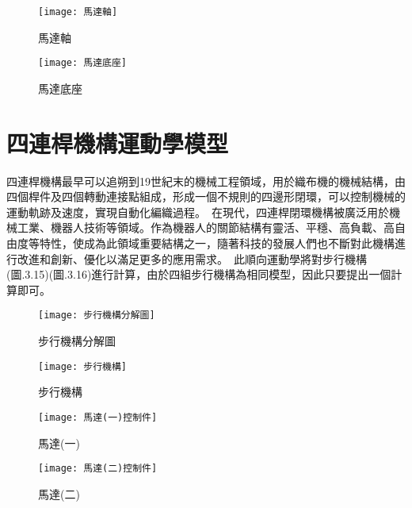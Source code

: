 \begin{figure}[htbp]
  \centering
  \begin{minipage}{0.3\textwidth}
    \centering
    \texttt{[image: 馬達軸]}
    \caption{馬達軸}
    \label{馬達軸}
  \end{minipage}
  \hfill
  \begin{minipage}{0.3\textwidth}
    \centering
    \texttt{[image: 馬達底座]}
    \caption{馬達底座}
    \label{馬達底座}
  \end{minipage}
 \end{figure}
\newpage

\section{四連桿機構運動學模型}

四連桿機構最早可以追朔到19世紀末的機械工程領域，用於織布機的機械結構，由四個桿件及四個轉動連接點組成，形成一個不規則的四邊形閉環，可以控制機械的運動軌跡及速度，實現自動化編織過程。\
在現代，四連桿閉環機構被廣泛用於機械工業、機器人技術等領域。作為機器人的關節結構有靈活、平穩、高負載、高自由度等特性，使成為此領域重要結構之一，隨著科技的發展人們也不斷對此機構進行改進和創新、優化以滿足更多的應用需求。\
此順向運動學將對步行機構(圖.3.15)(圖.3.16)進行計算，由於四組步行機構為相同模型，因此只要提出一個計算即可。\\
\begin{figure}[htbp]
  \begin{minipage}[t]{0.45\linewidth}
    \centering
    \texttt{[image: 步行機構分解圖]}
    \caption{步行機構分解圖}
    \label{步行機構分解圖}
  \end{minipage}
  \hfill
  \begin{minipage}[t]{0.45\linewidth}
    \centering
    \texttt{[image: 步行機構]}
    \caption{步行機構}
    \label{步行機構}
  \end{minipage}
\end{figure}
\newpage

\begin{figure}[htbp]
  \begin{minipage}[t]{0.5\linewidth}
    \centering
    \texttt{[image: 馬達(一)控制件]}
    \caption{馬達(一)}
    \label{馬達(一)控制件}
  \end{minipage}
  \hfill
  \begin{minipage}[t]{0.5\linewidth}
    \centering
    \texttt{[image: 馬達(二)控制件]}
    \caption{馬達(二)}
    \label{馬達(二)控制件}
  \end{minipage}
\end{figure}

